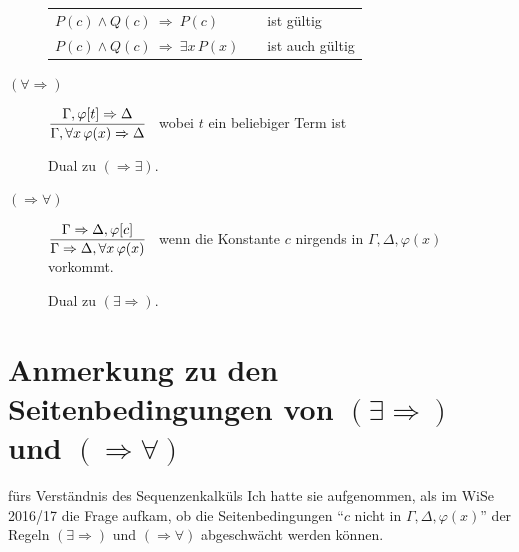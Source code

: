 \documentclass[fontsize=11pt, twoside=false, numbers=autoenddot]{scrbook}
\begin{document}
\begin{description}
\begin{center}
    \end{center}
    \par\medskip
    \begin{center}
      \begin{tabular}{l@{~}c@{\qquad}l@{}}
        $P(c) \land Q(c) ~\Rightarrow~ P(c)$            & & ist gültig \\[2pt]\cline{1-1}
        \rule{0pt}{12pt}%
        $P(c) \land Q(c) ~\Rightarrow~ \exists x\,P(x)$ & & ist auch gültig
      \end{tabular}
    \end{center}
    \par\bigskip
  \item[{\boldmath $(\forall\Rightarrow)$}]
    $
      \displaystyle
      \frac{\Gamma,\varphi[t] \Rightarrow \Delta}{\Gamma, \forall x \, \varphi(x) \Rightarrow \Delta}
    $
    ~wobei $t$ ein beliebiger Term ist
    ~\par\medskip
    Dual zu $(\Rightarrow\exists)$.
    \par\bigskip
  \item[{\boldmath $(\Rightarrow\forall)$}]
    $
      \displaystyle
      \frac{\Gamma \Rightarrow \Delta,\varphi[c]}{\Gamma \Rightarrow \Delta, \forall x \, \varphi(x) }
    $
    ~wenn die Konstante $c$ nirgends in $\Gamma,\Delta,\varphi(x)$ vorkommt.
    ~\par\medskip
    Dual zu $(\exists\Rightarrow)$.
\end{description}

\pagebreak
\section*{Anmerkung zu den Seitenbedingungen von {\boldmath $(\exists \Rightarrow)$ und $(\Rightarrow \forall)$}}

 fürs Verständnis des Sequenzenkalküls
Ich hatte sie aufgenommen, als im WiSe 2016/17 die Frage aufkam,
ob die Seitenbedingungen "`$c$ nicht in $\Gamma,\Delta,\varphi(x)$"'
der Regeln $(\exists \Rightarrow)$ und $(\Rightarrow \forall)$
abgeschwächt werden können.
\end{document}
